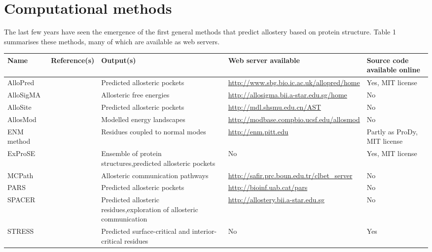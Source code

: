 \section{Computational methods}

The last few years have seen the emergence of the first general methods that predict allostery based on protein structure.
Table 1 summarises these methods, many of which are available as web servers.

\begin{table}
\centering

\begin{footnotesize}
\begin{tabular}{ l l p{5cm} l l }
\hline
Name & Reference(s) & Output(s) & Web server available & Source code available online \\
\hline
AlloPred & \cite{Greener2015} & Predicted allosteric pockets & \url{http://www.sbg.bio.ic.ac.uk/allopred/home} & Yes, MIT license \\
AlloSigMA & \cite{Guarnera2017} & Allosteric free energies & \url{http://allosigma.bii.a-star.edu.sg/home} & No \\
AlloSite & \cite{Huang2013} & Predicted allosteric pockets & \url{http://mdl.shsmu.edu.cn/AST} & No \\ %
AllosMod & \cite{Weinkam2012} & Modelled energy landscapes & \url{http://modbase.compbio.ucsf.edu/allosmod} & No \\
ENM method & \cite{Li2017} & Residues coupled to normal modes & \url{http://enm.pitt.edu} & Partly as ProDy, MIT license \\
ExProSE & \cite{Greener2017} & Ensemble of protein structures,\newline predicted allosteric pockets & No & Yes, MIT license \\
MCPath & \cite{Kaya2013} & Allosteric communication pathways & \url{http://safir.prc.boun.edu.tr/clbet_server} & No \\
PARS & \cite{Panjkovich2014, Panjkovich2012} & Predicted allosteric pockets & \url{http://bioinf.uab.cat/pars} & No \\
SPACER & \cite{Goncearenco2013, Mitternacht2011} & Predicted allosteric residues,\newline exploration of allosteric communication & \url{http://allostery.bii.a-star.edu.sg} & No \\ %
STRESS & \cite{Clarke2016} & Predicted surface-critical and interior-critical residues & No & Yes \\ %
\hline
\end{tabular}
\end{footnotesize}


\end{table}
